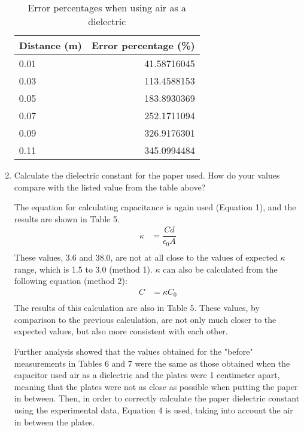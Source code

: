 \documentclass [12pt, letterpaper, twoside] {article}
\begin{document}
\begin{enumerate}
  \begin{table}
    \centering
    \begin{tabular}{| l | r |}
      \hline\hline
      Distance (m) & Error percentage (\%) \\
      \hline
      0.01 & 41.58716045 \\
      \hline
      0.03 & 113.4588153 \\
      \hline
      0.05 & 183.8930369 \\
      \hline
      0.07 & 252.1711094 \\
      \hline
      0.09 & 326.9176301 \\
      \hline
      0.11 & 345.0994484 \\
      \hline\hline
    \end{tabular}
    \caption{Error percentages when using air as a dielectric}
  \end{table}

  \item  Calculate the dielectric constant for the paper used.  How do your values compare with the listed value from the table above?
  
  The equation for calculating capacitance is again used (Equation 1), and the results are shown in Table 5.
  \begin{equation*}
    \begin{split}
      \kappa &= \dfrac{Cd}{\epsilon_{0}A} \\
    \end{split}
  \end{equation*}
  These values, 3.6 and 38.0, are not at all close to the values of expected \(\kappa\) range, which is 1.5 to 3.0 (method 1). \(\kappa\) can also be calculated from the following equation (method 2):
  \begin{equation*}
    \begin{split}
      C &= \kappa{C}_0 \\
    \end{split}
  \end{equation*}
  The results of this calculation are also in Table 5. These values, by comparison to the previous calculation, are not only much closer to the expected values, but also more consistent with each other.
  
  Further analysis showed that the values obtained for the "before" measurements in Tables 6 and 7 were the same as those obtained when the capacitor used air as a dielectric and the plates were 1 centimeter apart, meaning that the plates were not as close as possible when putting the paper in between. Then, in order to correctly calculate the paper dielectric constant using the experimental data, Equation 4 is used, taking into account the air in between the plates.


\end{enumerate}
\end{document}
